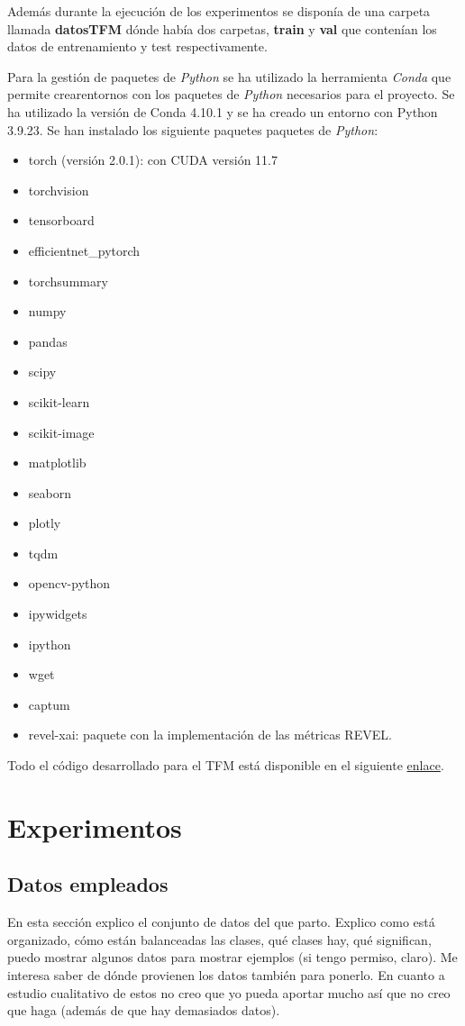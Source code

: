 Además durante la ejecución de los experimentos se disponía de una carpeta llamada \textbf{datosTFM} dónde había dos carpetas, \textbf{train} y \textbf{val} que contenían los datos de entrenamiento y test respectivamente.

Para la gestión de paquetes de \textit{Python} se ha utilizado la herramienta \textit{Conda} que permite crearentornos con los paquetes de \textit{Python} necesarios para el proyecto. Se ha utilizado la versión de Conda 4.10.1 y se ha creado un entorno con Python 3.9.23. Se han instalado los siguiente paquetes paquetes de \textit{Python}:

\begin{itemize}
    \item torch (versión 2.0.1): con CUDA versión 11.7
    \item torchvision
    \item tensorboard
    \item efficientnet\_pytorch
    \item torchsummary
    \item numpy
    \item pandas
    \item scipy
    \item scikit-learn
    \item scikit-image
    \item matplotlib
    \item seaborn
    \item plotly
    \item tqdm
    \item opencv-python
    \item ipywidgets
    \item ipython
    \item wget
    \item captum
    \item revel-xai: paquete con la implementación de las métricas REVEL.
\end{itemize}

Todo el código desarrollado para el TFM está disponible en el siguiente \href{https://github.com/CarlosLaraCasanova/Codigo_TFM/tree/main}{enlace}.


\clearpage


\newpage
\chapter{Experimentos} \label{cap:exp}


\section{Datos empleados} \label{sec:datos}
En esta sección explico el conjunto de datos del que parto. Explico como está organizado, cómo están balanceadas las clases, qué clases hay, qué significan, puedo mostrar algunos datos para mostrar ejemplos (si tengo permiso, claro). Me interesa saber de dónde provienen los datos también para ponerlo. En cuanto a estudio cualitativo de estos no creo que yo pueda aportar mucho así que no creo que haga (además de que hay demasiados datos).
